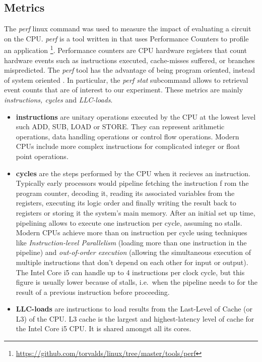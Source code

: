 \subsection{Metrics}
The \textit{perf} linux command was used to measure the impact of evaluating a
circuit on the CPU. \textit{perf} is a tool written in  that uses
Performance Counters to profile an application
\footnote{\url{https://github.com/torvalds/linux/tree/master/tools/perf}}.
Performance counters are CPU hardware registers that count hardware events such
as instructions executed, cache-misses suffered, or branches mispredicted\cite{perfwiki}.
The \textit{perf} tool has the advantage of being program oriented, instead of
system oriented \cite{ibm}.   In particular, the \textit{perf stat} subcommand
allows to retrieval event counts that are of interest to our experiment. These
metrics are mainly \textit{instructions, cycles} and \textit{LLC-loads}.
\begin{itemize}
\item \textbf{instructions} are unitary operations executed by the CPU at the
lowest level such ADD, SUB, LOAD or STORE. They can represent arithmetic operations,
data handling operations or control flow operations. Modern CPUs include more
complex instructions for complicated integer or float point operations.
\item \textbf{cycles} are the steps performed by the CPU when it recieves an
instruction. Typically early processors would pipeline fetching the instruction f
rom the program counter, decoding it, reading its associated variables from the
registers, executing its logic order and finally writing the result back to
registers or storing it the system's main memory\cite{jmor}. After an initial
set up time, pipelining allows to execute one instruction per cycle, assuming no
stalls. Modern CPUs achieve more than on instruction per cycle using techniques
like \textit{Instruction-level Parallelism} (loading more than one instruction
in the pipeline) and \textit{out-of-order execution} (allowing the simultaneous
execution of multiple instructions that don't depend on each other for input or
output). The Intel Core i5 can handle up to 4 instructions per clock cycle\cite{agner},
but this figure is usually lower because of stalls, i.e.\ when the pipeline
needs to for the result of a previous instruction before proceeding.

\item \textbf{LLC-loads} are instructions to load results from the Last-Level of
Cache (or L3) of the CPU. L3 cache is the largest and highest-latency level of
cache for the Intel Core i5 CPU. It is shared amongst all its cores.
\end{itemize}

